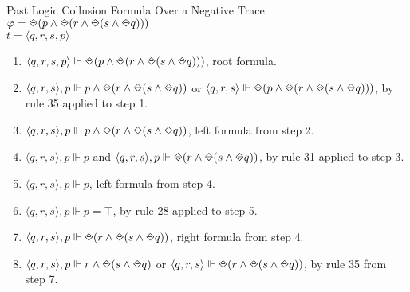\begin{myEx} Past Logic Collusion Formula Over a Negative Trace\\

\noindent
$\varphi = \LTLonce(p \land \LTLonce(r \land \LTLonce(s \land \LTLonce q)))$\\
$t = \langle q, r, s, p \rangle$\\

\begin{enumerate}
\item $\langle q, r, s, p \rangle \Vdash \LTLonce(p \land \LTLonce(r \land \LTLonce(s \land \LTLonce q)))$, root formula.\\ %

\item $\langle q, r, s \rangle, p \Vdash p \land \LTLonce(r \land \LTLonce(s \land \LTLonce q))$ or $\langle q, r, s \rangle \Vdash \LTLonce(p \land \LTLonce(r \land \LTLonce(s \land \LTLonce q)))$, by rule 35 applied to step 1.\\ %

\item $\langle q, r, s \rangle, p \Vdash p \land \LTLonce(r \land \LTLonce(s \land \LTLonce q))$, left formula from step 2.\\ %

\item $\langle q, r, s \rangle, p \Vdash p$ and $\langle q, r, s \rangle, p \Vdash \LTLonce(r \land \LTLonce(s \land \LTLonce q))$, by rule 31 applied to step 3.\\ %

\item $\langle q, r, s \rangle, p \Vdash p$, left formula from step 4.\\ %

\item $\langle q, r, s \rangle, p \Vdash p = \top$, by rule 28 applied to step 5.\\ %

\item $\langle q, r, s \rangle, p \Vdash \LTLonce(r \land \LTLonce(s \land \LTLonce q))$, right formula from step 4.\\ %

\item $\langle q, r, s \rangle, p \Vdash r \land \LTLonce(s \land \LTLonce q)$ or $\langle q, r, s \rangle \Vdash \LTLonce(r \land \LTLonce(s \land \LTLonce q))$, by rule 35 from step 7.\\ %


\end{enumerate}
\end{myEx}

